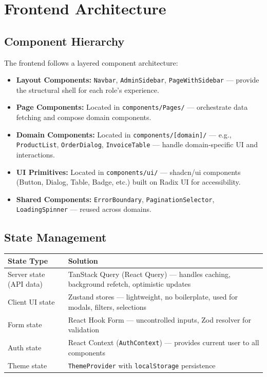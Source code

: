 \documentclass[12pt,a4paper]{report}
\begin{document}
\section{Frontend Architecture}

\subsection{Component Hierarchy}

The frontend follows a layered component architecture:

\begin{itemize}[leftmargin=1.5em]
  \item \textbf{Layout Components:} \texttt{Navbar}, \texttt{AdminSidebar}, \texttt{PageWithSidebar} --- provide the structural shell for each role's experience.
  \item \textbf{Page Components:} Located in \texttt{components/Pages/} --- orchestrate data fetching and compose domain components.
  \item \textbf{Domain Components:} Located in \texttt{components/[domain]/} --- e.g., \texttt{ProductList}, \texttt{OrderDialog}, \texttt{InvoiceTable} --- handle domain-specific UI and interactions.
  \item \textbf{UI Primitives:} Located in \texttt{components/ui/} --- shadcn/ui components (Button, Dialog, Table, Badge, etc.) built on Radix UI for accessibility.
  \item \textbf{Shared Components:} \texttt{ErrorBoundary}, \texttt{PaginationSelector}, \texttt{LoadingSpinner} --- reused across domains.
\end{itemize}

\subsection{State Management}

\begin{center}
\begin{tabularx}{\textwidth}{lX}
  \toprule
  \textbf{State Type} & \textbf{Solution} \\
  \midrule
  Server state (API data) & TanStack Query (React Query) --- handles caching, background refetch, optimistic updates \\
  Client UI state         & Zustand stores --- lightweight, no boilerplate, used for modals, filters, selections \\
  Form state              & React Hook Form --- uncontrolled inputs, Zod resolver for validation \\
  Auth state              & React Context (\texttt{AuthContext}) --- provides current user to all components \\
  Theme state             & \texttt{ThemeProvider} with \texttt{localStorage} persistence \\
  \bottomrule
\end{tabularx}
\end{center}
\end{document}
